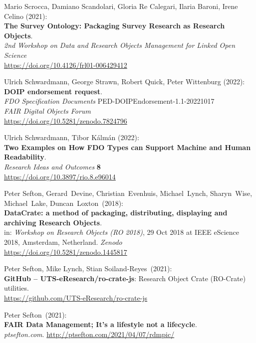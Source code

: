 \begin{thebibliography}{9}
Mario Scrocca, Damiano Scandolari, Gloria Re Calegari, Ilaria Baroni, Irene Celino (2021):\\
\textbf{The Survey Ontology: Packaging Survey Research as Research Objects}.\\
\emph{2nd Workshop on Data and Research Objects Management for Linked Open Science}\\
\url{https://doi.org/10.4126/frl01-006429412}

Ulrich Schwardmann, George Strawn, Robert Quick, Peter Wittenburg (2022): \\
\textbf{DOIP endorsement request}.\\
\emph{FDO Specification Documents} PED-DOIPEndorsement-1.1-20221017\\
\emph{FAIR Digital Objects Forum}\\
\url{https://doi.org/10.5281/zenodo.7824796}

Ulrich Schwardmann, Tibor Kálmán (2022): \\
\textbf{Two {Examples} on {How FDO Types} can {Support Machine} and {Human Readability}}.\\
\emph{Research Ideas and Outcomes} \textbf{8} \\
\url{https://doi.org/10.3897/rio.8.e96014}

Peter Sefton, Gerard~Devine, Christian~Evenhuis, Michael~Lynch, Sharyn~Wise,
Michael~Lake, Duncan~Loxton~(2018):\\
\textbf{DataCrate: a method of packaging, distributing, displaying and
archiving Research Objects}.\\
in: \emph{Workshop on Research Objects (RO 2018)}, 29 Oct 2018 at IEEE
eScience 2018, Amsterdam, Netherland. \emph{Zenodo}\\
\url{https://doi.org/10.5281/zenodo.1445817}

Peter Sefton, Mike Lynch, Stian Soiland-Reyes~(2021):\\
\textbf{GitHub -- UTS-eResearch/ro-crate-js}: Research Object Crate
(RO-Crate) utilities.\\
\url{https://github.com/UTS-eResearch/ro-crate-js}

Peter Sefton~(2021):\\
\textbf{FAIR Data Management; It's a lifestyle not a lifecycle}.\\
\emph{ptsefton.com}. \url{http://ptsefton.com/2021/04/07/rdmpic/}


\end{thebibliography}
